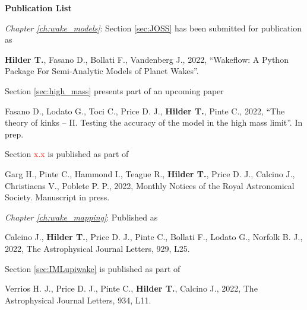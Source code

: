 \thispagestyle{plain}


\begin{center}
    
    {\Large \textbf{Publication List}}
    
\end{center}

\setlength{\parindent}{0pt}

\vspace{0.5cm}

\textit{Chapter \ref{ch:wake_models}}: \hspace{2pt}Section \ref{sec:JOSS} has been submitted for publication as


\begin{myquote}{58pt}
    \textbf{Hilder T.}, Fasano D., Bollati F., Vandenberg J., 2022, ``Wakeflow: A Python Package For Semi-Analytic Models of Planet Wakes''.
\end{myquote}

\hspace{58pt}Section \ref{sec:high_mass} presents part of an upcoming paper

\begin{myquote}{58pt}
    Fasano D., Lodato G., Toci C., Price D. J., \textbf{Hilder T.}, Pinte C., 2022, ``The theory of kinks -- II. Testing the accuracy of the model in the high mass limit''. In prep.
\end{myquote}

\hspace{58pt}Section {\textcolor{red}{x.x}} is published as part of

\begin{myquote}{58pt}
    Garg H., Pinte C., Hammond I., Teague R., \textbf{Hilder T.}, Price D. J., Calcino J., Christiaens V., Poblete P. P., 2022, Monthly Notices of the Royal Astronomical Society. Manuscript in press.
\end{myquote}

\vspace{0.5cm}

\textit{Chapter \ref{ch:wake_mapping}}: \hspace{2pt}Published as

\begin{myquote}{58pt}
    Calcino J., \textbf{Hilder T.}, Price D. J., Pinte C., Bollati F., Lodato G., Norfolk B. J., 2022, The Astrophysical Journal Letters, 929, L25.
\end{myquote}

\hspace{58pt}Section \ref{sec:IMLupiwake} is published as part of

\begin{myquote}{58pt}
    Verrios H. J., Price D. J., Pinte C., \textbf{Hilder T.}, Calcino J., 2022, The Astrophysical Journal Letters, 934, L11.
\end{myquote}

\setlength{\parindent}{15pt}
\newpage